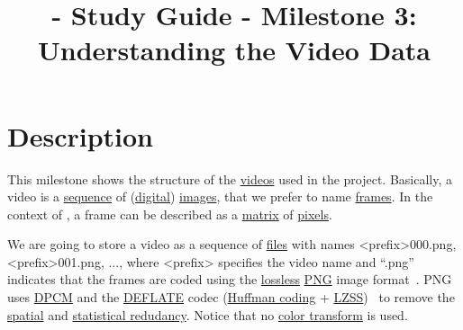 
\title{\SM{} - Study Guide - Milestone 3: Understanding the Video Data}

\maketitle

\section{Description}

This milestone shows the structure of the
\href{https://en.wikipedia.org/wiki/Video}{videos} used in the
\theproject{} project. Basically, a video is a
\href{https://en.wikipedia.org/wiki/Sequence}{sequence} of
(\href{https://en.wikipedia.org/wiki/Digital_data}{digital})
\href{https://en.wikipedia.org/wiki/Image}{images}, that we prefer to
name \href{https://en.wikipedia.org/wiki/Film_frame}{frames}. In the
context of \theproject{}, a frame can be described as a
\href{https://en.wikipedia.org/wiki/Matrix_(mathematics)}{matrix} of
\href{https://en.wikipedia.org/wiki/Pixel}{pixels}.

We are going to store a video as a sequence of
\href{https://en.wikipedia.org/wiki/Computer_file}{files} with names
<prefix>000.png, <prefix>001.png, ..., where <prefix> specifies the
video name and ``.png'' indicates that the frames are coded using the
\href{https://en.wikipedia.org/wiki/Lossless_compression}{lossless}
\href{https://en.wikipedia.org/wiki/Portable_Network_Graphics}{PNG}
image format~\cite{roelofs1999png}. PNG uses
\href{https://en.wikipedia.org/wiki/Differential_pulse-code_modulation}{DPCM}
and the \href{https://en.wikipedia.org/wiki/DEFLATE}{DEFLATE} codec
(\href{https://en.wikipedia.org/wiki/Huffman_coding}{Huffman coding} +
\href{https://en.wikipedia.org/wiki/Lempel-Ziv-Storer-Szymanski}{LZSS})~\cite{nelson96datacompression}
to remove the
\href{https://en.wikipedia.org/wiki/Image_compression}{spatial} and
\href{https://en.wikipedia.org/wiki/Data_compression}{statistical
  redudancy}. Notice that no
\href{https://en.wikipedia.org/wiki/YUV}{color transform} is used.

